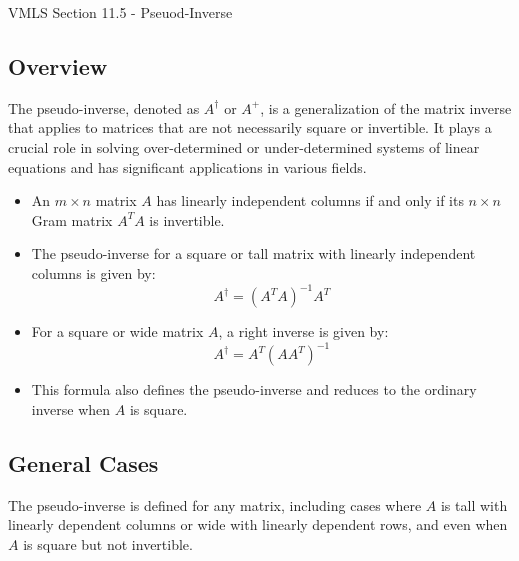 \begin{notes}{VMLS Section 11.5 - Pseuod-Inverse}
    \subsection*{Overview}
    The pseudo-inverse, denoted as $A^\dagger$ or $A^+$, is a generalization of the matrix inverse that applies to matrices that are not necessarily square or invertible. It plays a crucial role in 
    solving over-determined or under-determined systems of linear equations and has significant applications in various fields. \vspace*{1em}
    
    \begin{Highlight}
        \begin{itemize}
            \item An $m \times n$ matrix $A$ has linearly independent columns if and only if its $n \times n$ Gram matrix $A^T A$ is invertible.
            \item The pseudo-inverse for a square or tall matrix with linearly independent columns is given by:
            \begin{equation*}
                A^\dagger = (A^T A)^{-1}A^T
            \end{equation*}
        \end{itemize}
    \end{Highlight}
    
    \begin{Highlight}
        \begin{itemize}
            \item For a square or wide matrix $A$, a right inverse is given by:
            \begin{equation*}
                A^\dagger = A^T (A A^T)^{-1}
            \end{equation*}
            \item This formula also defines the pseudo-inverse and reduces to the ordinary inverse when $A$ is square.
        \end{itemize}
    \end{Highlight}
    
    \subsection*{General Cases}
    The pseudo-inverse is defined for any matrix, including cases where $A$ is tall with linearly dependent columns or wide with linearly dependent rows, and even when $A$ is square but not invertible.
    

\end{notes}
